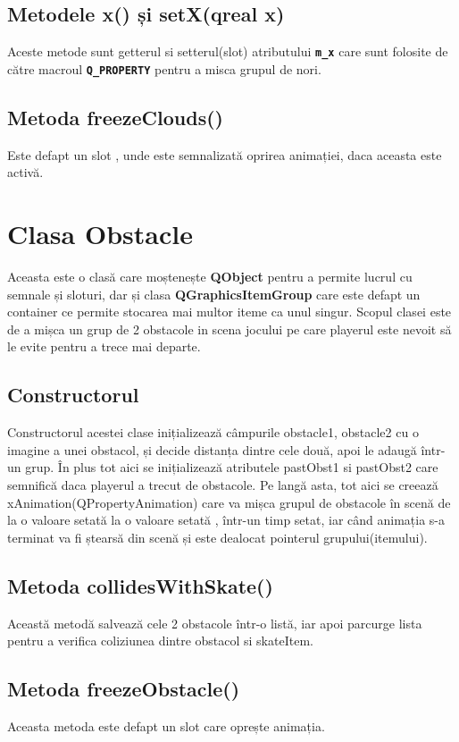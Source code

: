 \documentclass{article}
\begin{document}
\subsection{Metodele x() și setX(qreal x)}
Aceste metode sunt getterul si setterul(slot) atributului \textbf{\texttt{m\_x}} care sunt folosite de către macroul  \textbf{\texttt{Q\_PROPERTY}} pentru a misca grupul de nori.

\subsection{Metoda freezeClouds()}
Este defapt un slot , unde este semnalizată oprirea animației, daca aceasta este activă.

\section{Clasa Obstacle}
Aceasta este o clasă care moștenește \textbf{QObject} pentru a permite lucrul cu semnale și sloturi, dar și clasa \textbf{QGraphicsItemGroup} care este defapt un container ce permite stocarea mai multor iteme ca unul singur. Scopul clasei este de a mișca un grup de 2 obstacole in scena jocului pe care playerul este nevoit să le evite pentru a trece mai departe.

\subsection{Constructorul}
Constructorul acestei clase inițializează câmpurile obstacle1, obstacle2 cu o imagine a unei obstacol, și decide distanța dintre cele două, apoi le adaugă într-un grup. În plus tot aici se inițializează atributele pastObst1 si pastObst2 care semnifică daca playerul a trecut de obstacole. Pe langă asta, tot aici se creează xAnimation(QPropertyAnimation) care va mișca grupul de obstacole în scenă de la o valoare  setată la o valoare setată , într-un timp setat, iar când animația s-a terminat va fi ștearsă din scenă și este dealocat pointerul grupului(itemului).

\subsection{Metoda collidesWithSkate()}
Această metodă salvează cele 2 obstacole într-o listă, iar apoi parcurge lista pentru a verifica coliziunea dintre obstacol si skateItem.

\subsection{Metoda freezeObstacle()}
Aceasta metoda este defapt un slot care oprește animația.
\end{document}
